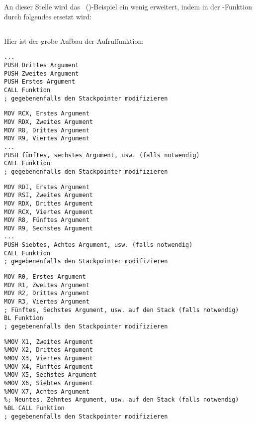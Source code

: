 \section{\PrintfSeveralArgumentsSectionName}

An dieser Stelle wird das \IT{\HelloWorldSectionName}~()-Beispiel ein
wenig erweitert, indem \printf in der \main-Funktion durch folgendes ersetzt wird:







\subsection{\Conclusion{}}

Hier ist der grobe Aufbau der Aufruffunktion:

\begin{lstlisting}[caption=x86]
...
PUSH Drittes Argument
PUSH Zweites Argument
PUSH Erstes Argument
CALL Funktion
; gegebenenfalls den Stackpointer modifizieren
\end{lstlisting}

\begin{lstlisting}[caption=x64 (MSVC)]
MOV RCX, Erstes Argument
MOV RDX, Zweites Argument
MOV R8, Drittes Argument
MOV R9, Viertes Argument
...
PUSH fünftes, sechstes Argument, usw. (falls notwendig)
CALL Funktion
; gegebenenfalls den Stackpointer modifizieren
\end{lstlisting}

\begin{lstlisting}[caption=x64 (GCC)]
MOV RDI, Erstes Argument
MOV RSI, Zweites Argument
MOV RDX, Drittes Argument
MOV RCX, Viertes Argument
MOV R8, Fünftes Argument
MOV R9, Sechstes Argument
...
PUSH Siebtes, Achtes Argument, usw. (falls notwendig)
CALL Funktion
; gegebenenfalls den Stackpointer modifizieren
\end{lstlisting}

\begin{lstlisting}[caption=ARM]
MOV R0, Erstes Argument
MOV R1, Zweites Argument
MOV R2, Drittes Argument
MOV R3, Viertes Argument
; Fünftes, Sechstes Argument, usw. auf den Stack (falls notwendig)
BL Funktion
; gegebenenfalls den Stackpointer modifizieren
\end{lstlisting}

\begin{lstlisting}[caption=ARM64]
%MOV X0, Erstes Argument
%MOV X1, Zweites Argument
%MOV X2, Drittes Argument
%MOV X3, Viertes Argument
%MOV X4, Fünftes Argument
%MOV X5, Sechstes Argument
%MOV X6, Siebtes Argument
%MOV X7, Achtes Argument
%; Neuntes, Zehntes Argument, usw. auf den Stack (falls notwendig)
%BL CALL Funktion
; gegebenenfalls den Stackpointer modifizieren
\end{lstlisting}

